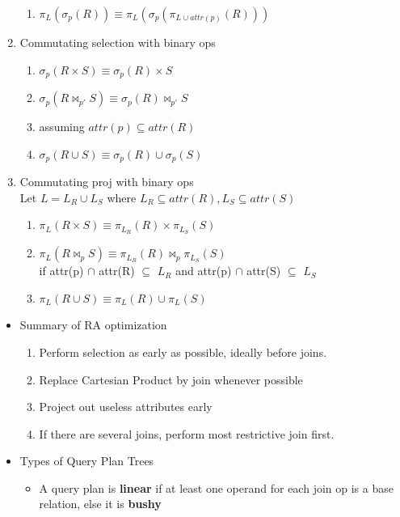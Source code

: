\documentclass[8pt, landscape]{extarticle}
\begin{document}
\begin{multicols*}{4}
\begin{enumerate}
      \begin{enumerate}
        \item $\pi_L(\sigma_p(R)) \equiv \pi_L(\sigma_p(\pi_{L \cup attr(p)}(R)))$
      \end{enumerate}
      \item Commutating selection with binary ops
      \begin{enumerate}
        \item $\sigma_p(R \times S) \equiv \sigma_p(R) \times S$
        \item $\sigma_p(R \bowtie_{p'} S) \equiv \sigma_p(R) \bowtie_{p'} S$
        \item assuming $attr(p) \subseteq attr(R)$
        \item $\sigma_p(R \cup S) \equiv \sigma_p(R) \cup \sigma_p(S)$
      \end{enumerate}
      \item Commutating proj with binary ops\\Let $L = L_R \cup L_S$ where $L_R \subseteq attr(R), L_S \subseteq attr(S)$
      \begin{enumerate}
        \item $\pi_L(R \times S) \equiv \pi_{L_R}(R) \times \pi_{L_S}(S)$
        \item $\pi_L(R \bowtie_p S) \equiv \pi_{L_R}(R) \bowtie_p \pi_{L_S}(S)$\\if attr(p) $\cap$ attr(R) $\subseteq$ $L_R$ and attr(p) $\cap$ attr(S) $\subseteq$ $L_S$ 
        \item $\pi_L(R \cup S) \equiv \pi_L (R) \cup \pi_L (S)$
      \end{enumerate}
    \end{enumerate}
    \begin{itemize}
      \item Summary of RA optimization
      \begin{enumerate}
        \item Perform selection as early as possible, ideally before joins.
        \item Replace Cartesian Product by join whenever possible
        \item Project out useless attributes early
        \item If there are several joins, perform most restrictive join first.
      \end{enumerate}
      \item Types of Query Plan Trees
      \begin{itemize}
        \item A query plan is \textbf{linear} if at least one operand for each join op is a base relation, else it is \textbf{bushy}

\end{itemize}
\end{itemize}
\end{multicols*}
\end{document}
